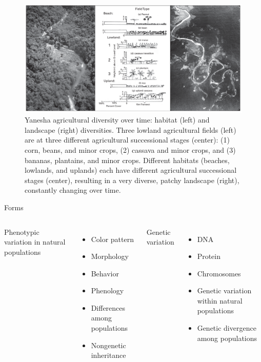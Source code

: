 \documentclass[
  ignorenonframetext,
  aspectratio=169]{beamer}
\begin{document}
\begin{frame}{}
\protect\hypertarget{section-12}{}
\begin{figure}
\includegraphics[width=0.7\linewidth]{./../images/yanesha_habitat_landscape_diversity} \caption{Yanesha agricultural diversity over time: habitat (left) and landscape (right) diversities. Three lowland agricultural fields (left) are at three different agricultural successional stages (center): (1) corn, beans, and minor crops, (2) cassava and minor crops, and (3) bananas, plantains, and minor crops. Different habitats (beaches, lowlands, and uplands) each have different agricultural successional stages (center), resulting in a very diverse, patchy landscape (right), constantly changing over time.}\label{fig:habitat-landscape}
\end{figure}
\end{frame}

\begin{frame}{Forms}
\protect\hypertarget{forms}{}
\begin{columns}[T,onlytextwidth]

  \alert{Phenotypic variation in natural populations}
  \begin{itemize}
  \item Color pattern
  \item Morphology
  \item Behavior
  \item Phenology
  \item Differences among populations
  \item Nongenetic inheritance
  \end{itemize}

  \alert{Genetic variation}
  \begin{itemize}
  \item DNA
  \item Protein
  \item Chromosomes
  \item Genetic variation within natural populations
  \item Genetic divergence among populations
  \end{itemize}

\end{columns}
\end{frame}
\end{document}
